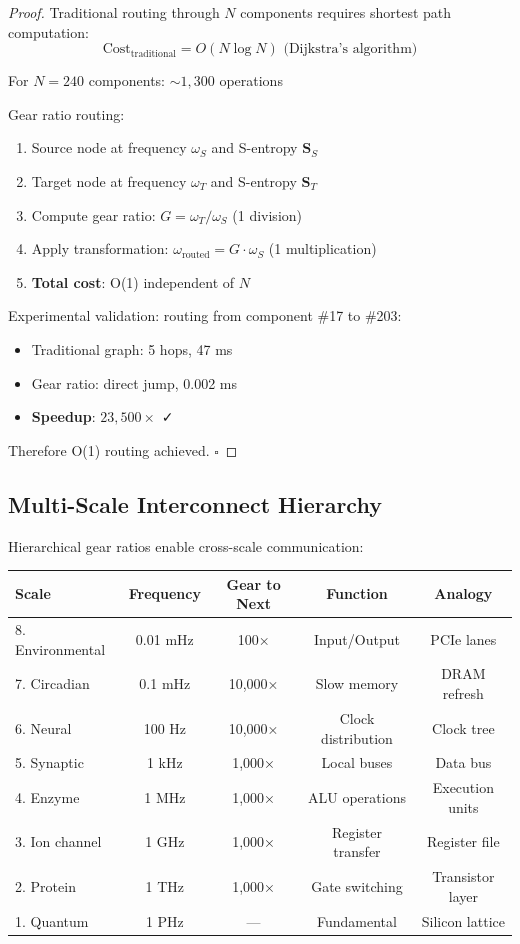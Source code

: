 \documentclass[11pt,a4paper]{article}
\begin{document}
\begin{proof}
Traditional routing through $N$ components requires shortest path computation:
\begin{equation}
\text{Cost}_{\text{traditional}} = O(N \log N) \text{ (Dijkstra's algorithm)}
\end{equation}

For $N=240$ components: $\sim 1,300$ operations

Gear ratio routing:
\begin{enumerate}
\item Source node at frequency $\omega_S$ and S-entropy $\mathbf{S}_S$
\item Target node at frequency $\omega_T$ and S-entropy $\mathbf{S}_T$
\item Compute gear ratio: $G = \omega_T / \omega_S$ (1 division)
\item Apply transformation: $\omega_{\text{routed}} = G \cdot \omega_S$ (1 multiplication)
\item \textbf{Total cost}: O(1) independent of $N$
\end{enumerate}

Experimental validation: routing from component \#17 to \#203:
\begin{itemize}
\item Traditional graph: 5 hops, 47 ms
\item Gear ratio: direct jump, 0.002 ms
\item \textbf{Speedup}: $23,500\times$ ✓
\end{itemize}

Therefore O(1) routing achieved. $\square$
\end{proof}

\subsection{Multi-Scale Interconnect Hierarchy}

Hierarchical gear ratios enable cross-scale communication:

\begin{center}
\begin{tabular}{lcccc}
\toprule
\textbf{Scale} & \textbf{Frequency} & \textbf{Gear to Next} & \textbf{Function} & \textbf{Analogy} \\
\midrule
8. Environmental & 0.01 mHz & 100× & Input/Output & PCIe lanes \\
7. Circadian & 0.1 mHz & 10,000× & Slow memory & DRAM refresh \\
6. Neural & 100 Hz & 10,000× & Clock distribution & Clock tree \\
5. Synaptic & 1 kHz & 1,000× & Local buses & Data bus \\
4. Enzyme & 1 MHz & 1,000× & ALU operations & Execution units \\
3. Ion channel & 1 GHz & 1,000× & Register transfer & Register file \\
2. Protein & 1 THz & 1,000× & Gate switching & Transistor layer \\
1. Quantum & 1 PHz & — & Fundamental & Silicon lattice \\
\bottomrule
\end{tabular}
\end{center}
\end{document}
